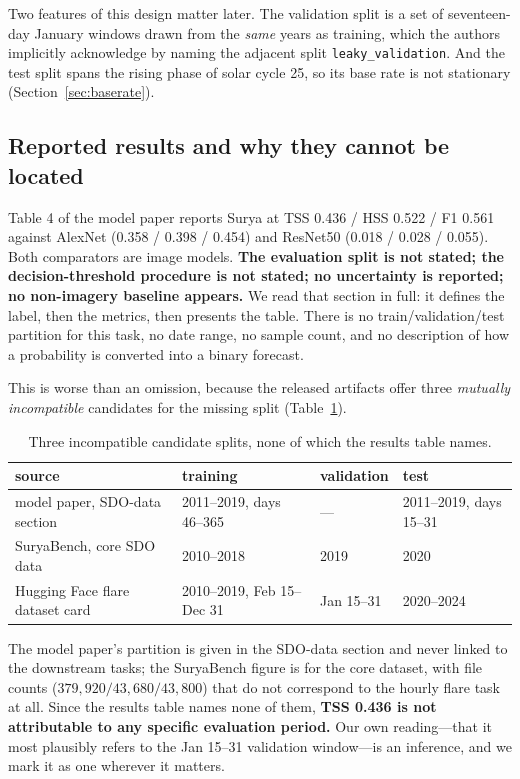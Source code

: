 \documentclass[11pt]{article}
\newcommand{\code}[1]{\texttt{#1}}
\begin{document}
Two features of this design matter later. The validation split is a set of
seventeen-day January windows drawn from the \emph{same} years as training, which
the authors implicitly acknowledge by naming the adjacent split
\code{leaky\_validation}. And the test split spans the rising phase of solar
cycle 25, so its base rate is not stationary (Section~\ref{sec:baserate}).

\subsection{Reported results and why they cannot be located}
\label{sec:located}

Table 4 of the model paper reports Surya at TSS 0.436 / HSS 0.522 / F1 0.561
against AlexNet (0.358 / 0.398 / 0.454) and ResNet50 (0.018 / 0.028 / 0.055).
Both comparators are image models. \textbf{The evaluation split is not stated;
the decision-threshold procedure is not stated; no uncertainty is reported; no
non-imagery baseline appears.} We read that section in full: it defines the
label, then the metrics, then presents the table. There is no
train/validation/test partition for this task, no date range, no sample count,
and no description of how a probability is converted into a binary forecast.

This is worse than an omission, because the released artifacts offer three
\emph{mutually incompatible} candidates for the missing split
(Table~\ref{tab:threesplits}).

\begin{table}[htbp]
\centering
\caption{Three incompatible candidate splits, none of which the results table
names.}
\label{tab:threesplits}
\small
\begin{tabular}{llll}
\toprule
source & training & validation & test \\
\midrule
model paper, SDO-data section & 2011--2019, days 46--365 & --- & 2011--2019, days 15--31 \\
SuryaBench, core SDO data & 2010--2018 & 2019 & 2020 \\
Hugging Face flare dataset card & 2010--2019, Feb 15--Dec 31 & Jan 15--31 & 2020--2024 \\
\bottomrule
\end{tabular}
\end{table}

The model paper's partition is given in the SDO-data section and never linked to
the downstream tasks; the SuryaBench figure is for the core dataset, with file
counts ($379{,}920 / 43{,}680 / 43{,}800$) that do not correspond to the hourly
flare task at all. Since the results table names none of them, \textbf{TSS 0.436
is not attributable to any specific evaluation period.} Our own reading---that it
most plausibly refers to the Jan 15--31 validation window---is an inference, and
we mark it as one wherever it matters.
\end{document}

